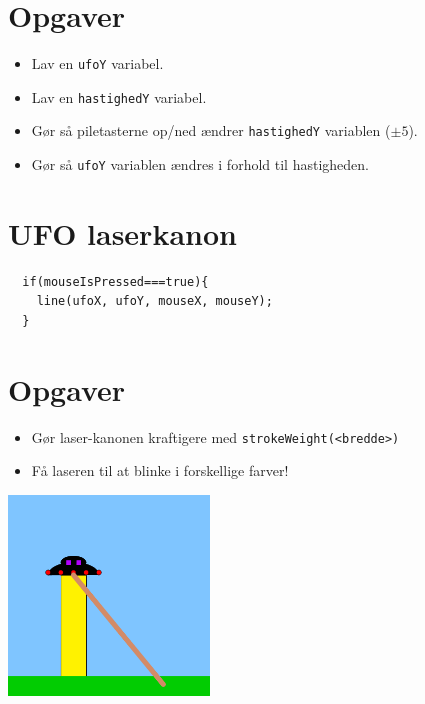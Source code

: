\documentclass[oneside,a4paper,10pts,article]{memoir}
\begin{document}
\chapter{Opgaver}
\begin{itemize}
\item Lav en \texttt{ufoY} variabel.
\item Lav en \texttt{hastighedY} variabel.
\item Gør så piletasterne op/ned ændrer \texttt{hastighedY} variablen ($\pm5$).
\item Gør så \texttt{ufoY} variablen ændres i forhold til hastigheden.
\end{itemize}

\chapter{UFO laserkanon}
\begin{lstlisting}
  if(mouseIsPressed===true){
    line(ufoX, ufoY, mouseX, mouseY);
  }
\end{lstlisting}

\chapter{Opgaver}
\begin{itemize}
\item Gør laser-kanonen kraftigere med \texttt{strokeWeight(<bredde>)}
\item Få laseren til at blinke i forskellige farver!
\end{itemize}

\hspace{1cm}
\includegraphics[width=0.4\textwidth]{pics/laserkanon.png}
\end{document}
